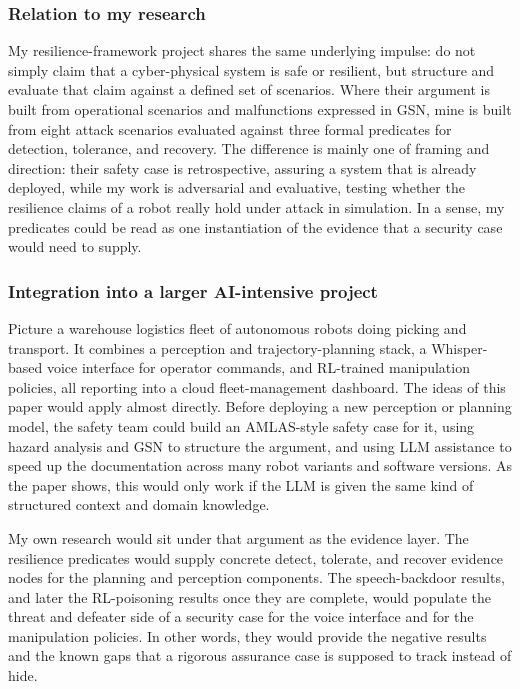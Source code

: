\documentclass[11pt,a4paper]{article}
\begin{document}
\subsubsection{Relation to my research}

My resilience-framework project shares the same underlying impulse: do not simply claim that a cyber-physical system is safe or resilient, but structure and evaluate that claim against a defined set of scenarios. Where their argument is built from operational scenarios and malfunctions expressed in GSN, mine is built from eight attack scenarios evaluated against three formal predicates for detection, tolerance, and recovery. The difference is mainly one of framing and direction: their safety case is retrospective, assuring a system that is already deployed, while my work is adversarial and evaluative, testing whether the resilience claims of a robot really hold under attack in simulation. In a sense, my predicates could be read as one instantiation of the evidence that a security case would need to supply.

\subsubsection{Integration into a larger AI-intensive project}

Picture a warehouse logistics fleet of autonomous robots doing picking and transport. It combines a perception and trajectory-planning stack, a Whisper-based voice interface for operator commands, and RL-trained manipulation policies, all reporting into a cloud fleet-management dashboard. The ideas of this paper would apply almost directly. Before deploying a new perception or planning model, the safety team could build an AMLAS-style safety case for it, using hazard analysis and GSN to structure the argument, and using LLM assistance to speed up the documentation across many robot variants and software versions. As the paper shows, this would only work if the LLM is given the same kind of structured context and domain knowledge.

My own research would sit under that argument as the evidence layer. The resilience predicates would supply concrete detect, tolerate, and recover evidence nodes for the planning and perception components. The speech-backdoor results, and later the RL-poisoning results once they are complete, would populate the threat and defeater side of a security case for the voice interface and for the manipulation policies. In other words, they would provide the negative results and the known gaps that a rigorous assurance case is supposed to track instead of hide.
\end{document}
